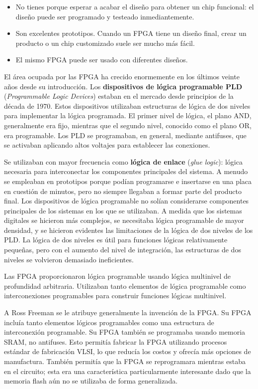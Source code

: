 \begin{itemize}
    \item No tienes porque esperar a acabar el diseño para obtener un chip funcional: el diseño puede ser programado y testeado inmediantemente. 
    \item Son excelentes prototipos. Cuando un FPGA tiene un diseño final, crear un producto o un chip customizado suele ser mucho más fácil.
    \item El mismo FPGA puede ser usado con diferentes diseños. 
\end{itemize}

El área ocupada por las FPGA ha crecido enormemente en los últimos veinte años desde su introducción. Los \textbf{dispositivos de lógica programable PLD} (\textit{Programmable Logic Devices}) estaban en el mercado desde principios de la década de 1970. Estos dispositivos utilizaban estructuras de lógica de dos niveles para implementar la lógica programada. El primer nivel de lógica, el plano AND, generalmente era fijo, mientras que el segundo nivel, conocido como el plano OR, era programable. Los PLD se programaban, en general, mediante antifuses, que se activaban aplicando altos voltajes para establecer las conexiones.

Se utilizaban con mayor frecuencia como \textbf{lógica de enlace } (\textit{glue logic}): lógica necesaria para interconectar los componentes principales del sistema. A menudo se empleaban en prototipos porque podían programarse e insertarse en una placa en cuestión de minutos, pero no siempre llegaban a formar parte del producto final. Los dispositivos de lógica programable no solían considerarse componentes principales de los sistemas en los que se utilizaban. A medida que los sistemas digitales se hicieron más complejos, se necesitaba lógica programable de mayor densidad, y se hicieron evidentes las limitaciones de la lógica de dos niveles de los PLD. La lógica de dos niveles es útil para funciones lógicas relativamente pequeñas, pero con el aumento del nivel de integración, las estructuras de dos niveles se volvieron demasiado ineficientes.

Las FPGA proporcionaron lógica programable usando lógica multinivel de profundidad arbitraria. Utilizaban tanto elementos de lógica programable como interconexiones programables para construir funciones lógicas multinivel. 

A Ross Freeman se le atribuye generalmente la invención de la FPGA. Su FPGA incluía tanto elementos lógicos programables como una estructura de interconexión programable. Su FPGA también se programaba usando memoria SRAM, no antifuses. Esto permitía fabricar la FPGA utilizando procesos estándar de fabricación VLSI, lo que reducía los costos y ofrecía más opciones de manufactura. También permitía que la FPGA se reprogramara mientras estaba en el circuito; esta era una característica particularmente interesante dado que la memoria flash aún no se utilizaba de forma generalizada.

